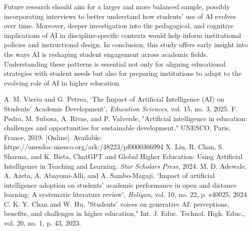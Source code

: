 \documentclass[12pt]{article}
\begin{document}
Future research should aim for a larger and more balanced sample, possibly incorporating interviews to better understand how students’ use of AI evolves over time. Moreover, deeper investigation into the pedagogical, and cognitive implications of AI in discipline-specific contexts would help inform institutional policies and instructional design.
In conclusion, this study offers early insight into the ways AI is reshaping student engagement across academic fields. Understanding these patterns is essential not only for aligning educational strategies with student needs but also for preparing institutions to adapt to the evolving role of AI in higher education.


\pagebreak

\begin{thebibliography}{9}
   A. M. Vieriu and G. Petrea, ‘The Impact of Artificial Intelligence (AI) on Students’ Academic Development’, \textit{Education Sciences}, vol. 15, no. 3, 2025.
   F. Pedro, M. Subosa, A. Rivas, and P. Valverde, "Artificial intelligence in education: challenges and opportunities for sustainable development," UNESCO, Paris, France, 2019. [Online]. Available: https://unesdoc.unesco.org/ark:/48223/pf0000366994
   X. Lin, R. Chan, S. Sharma, and K. Bista, ChatGPT and Global Higher Education: Using Artificial Intelligence in Teaching and Learning. \textit{Star Scholars Press}, 2024. 
   M. D. Adewale, A. Azeta, A. Abayomi-Alli, and A. Sambo-Magaji, ‘Impact of artificial intelligence adoption on students’ academic performance in open and distance learning: A systematic literature review’, \textit{Heliyon}, vol. 10, no. 22, p. e40025, 2024.
   C. K. Y. Chan and W. Hu, "Students' voices on generative AI: perceptions, benefits, and challenges in higher education," Int. J. Educ. Technol. High. Educ., vol. 20, no. 1, p. 43, 2023.
\end{thebibliography}

\appendix
\end{document}
